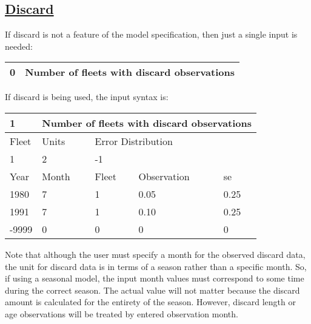 \hypertarget{Discard}{}
\subsection[Discard]{\protect\hyperlink{Discard}{Discard}}
If discard is not a feature of the model specification, then just a single input is needed:

\begin{center}
	\begin{tabular}{p{2cm} p{13cm}}
		\hline
		0 & Number of fleets with discard observations \Tstrut\Bstrut\\
		\hline
	\end{tabular}
	\leavevmode\tagmcend\tagstructend\par
\end{center}
	
	
If discard is being used, the input syntax is:
\begin{center}
	\begin{tabular}{p{2cm} p{3cm} p{3cm} p{3cm} p{3cm}}
		\hline
		1 & \multicolumn{4}{l}{Number of fleets with discard observations} \Tstrut\Bstrut\\
		\hline
		Fleet & Units & \multicolumn{3}{l}{Error Distribution} \Tstrut\Bstrut\\
		\hline
		1 & 2 & \multicolumn{3}{l}{-1} \Tstrut\Bstrut\\
		\hline
		Year & Month & Fleet & Observation & \gls{se} \Tstrut\Bstrut\\
		\hline
		1980  & 7 & 1 & 0.05 & 0.25 \Tstrut\\
		1991  & 7 & 1 & 0.10 & 0.25 \\
		-9999 & 0 & 0 &    0 & 0 \Bstrut\\
		\hline
	\end{tabular}
	\leavevmode\tagmcend\tagstructend\par
\end{center}

Note that although the user must specify a month for the observed discard data, the unit for discard data is in terms of a season rather than a specific month. So, if using a seasonal model, the input month values must correspond to some time during the correct season. The actual value will not matter because the discard amount is calculated for the entirety of the season. However, discard length or age observations will be treated by entered observation month.
	
